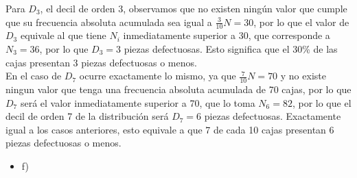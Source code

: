 \documentclass[a4paper,12pt]{article}
\begin{document}
Para $D_3$, el decil de orden 3, observamos que no existen ningún valor que cumple que su frecuencia absoluta acumulada sea igual a $\frac{3}{10}N = 30$, por lo que el valor de $D_3$ equivale al que tiene $N_i$ inmediatamente superior a 30, que corresponde a $N_3 = 36$, por lo que $D_3 = 3$ piezas defectuosas. Esto significa que el 30\% de las cajas presentan 3 piezas defectuosas o menos.\\
En el caso de $D_7$ ocurre exactamente lo mismo, ya que $\frac{7}{10}N = 70$ y no existe ningun valor que tenga una frecuencia absoluta acumulada de 70 cajas, por lo que $D_7$ será el valor inmediatamente superior a 70, que lo toma $N_6 = 82$, por lo que el decil de orden 7 de la distribución será $D_7 =6$ piezas defectuosas. Exactamente igual a los casos anteriores, esto equivale a que 7 de cada 10 cajas presentan 6 piezas defectuosas o menos.\\

\begin {itemize}
    \item [f)]  
\end {itemize}
\end{document}
